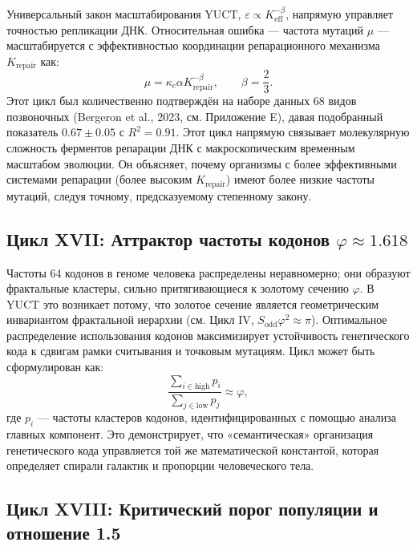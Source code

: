 \documentclass[12pt]{article}
\begin{document}
	Универсальный закон масштабирования YUCT, $\varepsilon \propto K_{\mathrm{eff}}^{-\beta}$, напрямую управляет точностью репликации ДНК. Относительная ошибка — частота мутаций $\mu$ — масштабируется с эффективностью координации репарационного механизма $K_{\mathrm{repair}}$ как:
	\begin{equation}
		\boxed{ \mu = \kappa_c \alpha K_{\mathrm{repair}}^{-\beta}, \qquad \beta = \frac{2}{3} }.
	\end{equation}
	Этот цикл был количественно подтверждён на наборе данных 68 видов позвоночных (Bergeron et al., 2023, см. Приложение E), давая подобранный показатель $0.67 \pm 0.05$ с $R^2 = 0.91$. Этот цикл напрямую связывает молекулярную сложность ферментов репарации ДНК с макроскопическим временным масштабом эволюции. Он объясняет, почему организмы с более эффективными системами репарации (более высоким $K_{\mathrm{repair}}$) имеют более низкие частоты мутаций, следуя точному, предсказуемому степенному закону.
	
	\subsection{Цикл XVII: Аттрактор частоты кодонов $\varphi \approx 1.618$}
	
	Частоты 64 кодонов в геноме человека распределены неравномерно; они образуют фрактальные кластеры, сильно притягивающиеся к золотому сечению $\varphi$. В YUCT это возникает потому, что золотое сечение является геометрическим инвариантом фрактальной иерархии (см. Цикл IV, $S_{\mathrm{odd}}\varphi^2 \approx \pi$). Оптимальное распределение использования кодонов максимизирует устойчивость генетического кода к сдвигам рамки считывания и точковым мутациям. Цикл может быть сформулирован как:
	\begin{equation}
		\boxed{ \frac{\sum_{i \in \text{high}} p_i}{\sum_{j \in \text{low}} p_j} \approx \varphi },
	\end{equation}
	где $p_i$ — частоты кластеров кодонов, идентифицированных с помощью анализа главных компонент. Это демонстрирует, что «семантическая» организация генетического кода управляется той же математической константой, которая определяет спирали галактик и пропорции человеческого тела.
	
	\subsection{Цикл XVIII: Критический порог популяции и отношение 1.5}
	
\end{document}

